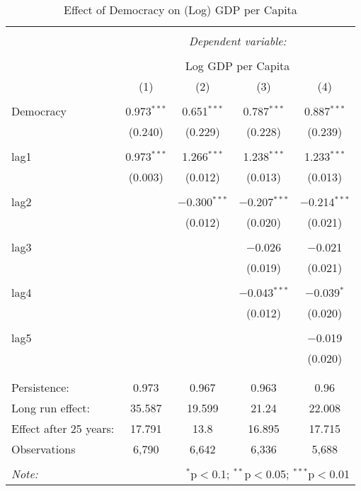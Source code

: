 
\begin{table}[!htbp] \centering 
  \caption{Effect of Democracy on (Log) GDP per Capita} 
  \label{} 
\begin{tabular}{@{\extracolsep{5pt}}lcccc} 
\\[-1.8ex]\hline 
\hline \\[-1.8ex] 
 & \multicolumn{4}{c}{\textit{Dependent variable:}} \\ 
\cline{2-5} 
\\[-1.8ex] & \multicolumn{4}{c}{Log GDP per Capita} \\ 
 & (1) & (2) & (3) & (4) \\ 
\hline \\[-1.8ex] 
 Democracy & 0.973$^{***}$ & 0.651$^{***}$ & 0.787$^{***}$ & 0.887$^{***}$ \\ 
  & (0.240) & (0.229) & (0.228) & (0.239) \\ 
  & & & & \\ 
 lag1 & 0.973$^{***}$ & 1.266$^{***}$ & 1.238$^{***}$ & 1.233$^{***}$ \\ 
  & (0.003) & (0.012) & (0.013) & (0.013) \\ 
  & & & & \\ 
 lag2 &  & $-$0.300$^{***}$ & $-$0.207$^{***}$ & $-$0.214$^{***}$ \\ 
  &  & (0.012) & (0.020) & (0.021) \\ 
  & & & & \\ 
 lag3 &  &  & $-$0.026 & $-$0.021 \\ 
  &  &  & (0.019) & (0.021) \\ 
  & & & & \\ 
 lag4 &  &  & $-$0.043$^{***}$ & $-$0.039$^{*}$ \\ 
  &  &  & (0.012) & (0.020) \\ 
  & & & & \\ 
 lag5 &  &  &  & $-$0.019 \\ 
  &  &  &  & (0.020) \\ 
  & & & & \\ 
\hline \\[-1.8ex] 
Persistence:  & 0.973 & 0.967 & 0.963 & 0.96 \\ 
Long run effect:  & 35.587 & 19.599 & 21.24 & 22.008 \\ 
Effect after 25 years:  & 17.791 & 13.8 & 16.895 & 17.715 \\ 
Observations & 6,790 & 6,642 & 6,336 & 5,688 \\ 
\hline 
\hline \\[-1.8ex] 
\textit{Note:}  & \multicolumn{4}{r}{$^{*}$p$<$0.1; $^{**}$p$<$0.05; $^{***}$p$<$0.01} \\ 
\end{tabular} 
\end{table} 
